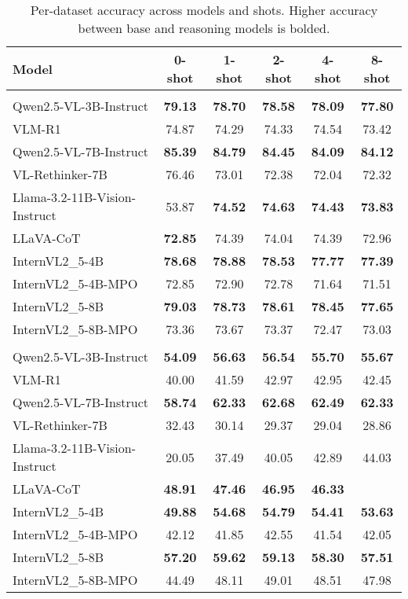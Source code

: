\begin{table}[!h]
\centering
\small
\begin{tabular}{lccccc}
\toprule
\textbf{Model} & 0-shot & 1-shot & 2-shot & 4-shot & 8-shot \\
\midrule
\rowcolor{gray!20} \multicolumn{6}{c}{\textbf{TextVQA}} \\
\midrule
{Qwen2.5-VL-3B-Instruct} & \textbf{79.13} & \textbf{78.70} & \textbf{78.58} & \textbf{78.09} & \textbf{77.80} \\
{VLM-R1} & 74.87 & 74.29 & 74.33 & 74.54 & 73.42 \\
\midrule
{Qwen2.5-VL-7B-Instruct} & \textbf{85.39} & \textbf{84.79} & \textbf{84.45} & \textbf{84.09} & \textbf{84.12} \\
{VL-Rethinker-7B} & 76.46 & 73.01 & 72.38 & 72.04 & 72.32 \\
\midrule
{Llama-3.2-11B-Vision-Instruct} & 53.87 & \textbf{74.52} & \textbf{74.63} & \textbf{74.43} & \textbf{73.83} \\
{LLaVA-CoT} & \textbf{72.85} & 74.39 & 74.04 & 74.39 & 72.96 \\
\midrule
{InternVL2\_5-4B} & \textbf{78.68} & \textbf{78.88} & \textbf{78.53} & \textbf{77.77} & \textbf{77.39} \\
{InternVL2\_5-4B-MPO} & 72.85 & 72.90 & 72.78 & 71.64 & 71.51 \\
\midrule
{InternVL2\_5-8B} & \textbf{79.03} & \textbf{78.73} & \textbf{78.61} & \textbf{78.45} & \textbf{77.65} \\
{InternVL2\_5-8B-MPO} & 73.36 & 73.67 & 73.37 & 72.47 & 73.03 \\
\midrule
\rowcolor{gray!20} \multicolumn{6}{c}{\textbf{OK-VQA}} \\
\midrule
{Qwen2.5-VL-3B-Instruct} & \textbf{54.09} & \textbf{56.63} & \textbf{56.54} & \textbf{55.70} & \textbf{55.67} \\
{VLM-R1} & 40.00 & 41.59 & 42.97 & 42.95 & 42.45 \\
\midrule
{Qwen2.5-VL-7B-Instruct} & \textbf{58.74} & \textbf{62.33} & \textbf{62.68} & \textbf{62.49} & \textbf{62.33} \\
{VL-Rethinker-7B} & 32.43 & 30.14 & 29.37 & 29.04 & 28.86 \\
\midrule
{Llama-3.2-11B-Vision-Instruct} & 20.05 & 37.49 & 40.05 & 42.89 & 44.03 \\
{LLaVA-CoT} & \textbf{48.91} & \textbf{47.46} & \textbf{46.95} & \textbf{46.33} &  \\
\midrule
{InternVL2\_5-4B} & \textbf{49.88} & \textbf{54.68} & \textbf{54.79} & \textbf{54.41} & \textbf{53.63} \\
{InternVL2\_5-4B-MPO} & 42.12 & 41.85 & 42.55 & 41.54 & 42.05 \\
\midrule
{InternVL2\_5-8B} & \textbf{57.20} & \textbf{59.62} & \textbf{59.13} & \textbf{58.30} & \textbf{57.51} \\
{InternVL2\_5-8B-MPO} & 44.49 & 48.11 & 49.01 & 48.51 & 47.98 \\
\bottomrule
\end{tabular}
\caption{Per-dataset accuracy across models and shots. Higher accuracy between base and reasoning models is bolded.}
\label{tab:per_dataset_bolded}
\end{table}